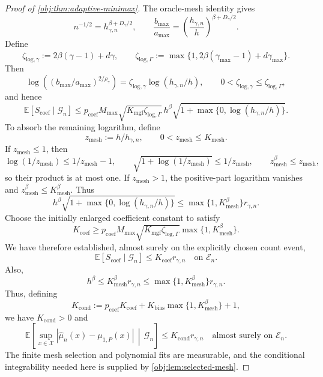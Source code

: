 \documentclass[11pt]{article}
\begin{document}
\begin{proof}[Proof of \cref{obj:thm:adaptive-minimax}]
The oracle-mesh identity gives
\[
n^{-1/2}=h_{\gamma,n}^{\beta+D_\gamma/2},
\qquad
\frac{b_{\mathrm{max}}}{a_{\mathrm{max}}}
=\left(\frac{h_{\gamma,n}}h\right)^{\beta+D_\gamma/2}.
\]
Define
\[
\zeta_{\mathrm{log},\gamma}:=2\beta(\gamma-1)+d\gamma,
\qquad
\zeta_{\mathrm{log},\Gamma}
:=\max\{1,2\beta(\gamma_{\max}-1)+d\gamma_{\max}\}.
\]
Then
\[
\log\left((b_{\mathrm{max}}/a_{\mathrm{max}})^{2/\rho_\gamma}\right)
=\zeta_{\mathrm{log},\gamma}\log(h_{\gamma,n}/h),
\qquad
0<\zeta_{\mathrm{log},\gamma}\le\zeta_{\mathrm{log},\Gamma},
\]
and hence
\[
\mathbb E[S_{\mathrm{coef}}\mid\mathcal G_n]
\le p_{\mathrm{coef}}M_{\mathrm{max}}
\sqrt{K_{\mathrm{mgf}}\zeta_{\mathrm{log},\Gamma}}\,
 h^\beta\sqrt{1+\max\{0,\log(h_{\gamma,n}/h)\}}.
\]
To absorb the remaining logarithm, define
\[
z_{\mathrm{mesh}}:=h/h_{\gamma,n},
\qquad
0<z_{\mathrm{mesh}}\le K_{\mathrm{mesh}}.
\]
If \(z_{\mathrm{mesh}}\le1\), then
\[
\log(1/z_{\mathrm{mesh}})\le1/z_{\mathrm{mesh}}-1,
\qquad
\sqrt{1+\log(1/z_{\mathrm{mesh}})}\le1/z_{\mathrm{mesh}},
\qquad
z_{\mathrm{mesh}}^\beta\le z_{\mathrm{mesh}},
\]
so their product is at most one. If \(z_{\mathrm{mesh}}>1\), the positive-part logarithm vanishes and \(z_{\mathrm{mesh}}^\beta\le K_{\mathrm{mesh}}^\beta\). Thus
\[
h^\beta\sqrt{1+\max\{0,\log(h_{\gamma,n}/h)\}}
\le\max\{1,K_{\mathrm{mesh}}^\beta\}r_{\gamma,n}.
\]
Choose the initially enlarged coefficient constant to satisfy
\[
K_{\mathrm{coef}}\ge
p_{\mathrm{coef}}M_{\mathrm{max}}
\sqrt{K_{\mathrm{mgf}}\zeta_{\mathrm{log},\Gamma}}
\max\{1,K_{\mathrm{mesh}}^\beta\}.
\]
We have therefore established, almost surely on the explicitly chosen count event,
\[
\mathbb E[S_{\mathrm{coef}}\mid\mathcal G_n]
\le K_{\mathrm{coef}}r_{\gamma,n}
\quad\text{on }\mathcal E_n.
\]
Also,
\[
h^\beta
\le K_{\mathrm{mesh}}^\beta r_{\gamma,n}
\le \max\{1,K_{\mathrm{mesh}}^\beta\}r_{\gamma,n}.
\]
Thus, defining
\[
K_{\mathrm{cond}}
:=
p_{\mathrm{coef}}K_{\mathrm{coef}}
+
K_{\mathrm{bias}}\max\{1,K_{\mathrm{mesh}}^\beta\}
+1,
\]
we have \(K_{\mathrm{cond}}>0\) and
\[
\mathbb E\!\left[
\sup_{x\in\mathcal X}
|\widehat\mu_n(x)-\mu_{1,P}(x)|
\,\middle|\,\mathcal G_n
\right]
\le K_{\mathrm{cond}}r_{\gamma,n}
\quad\text{almost surely on }\mathcal E_n.
\]
The finite mesh selection and polynomial fits are measurable, and the conditional integrability needed here is supplied by \cref{obj:lem:selected-mesh}.


\end{proof}
\end{document}
